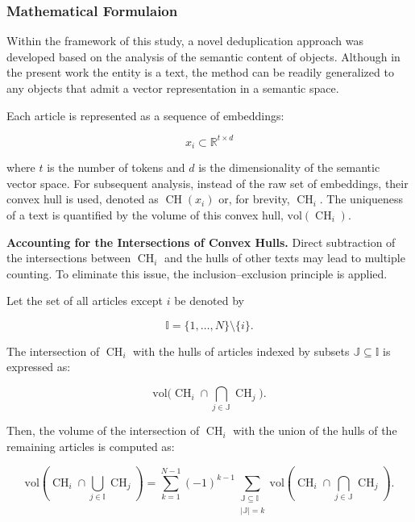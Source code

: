 \subsubsection{Mathematical Formulaion}
\label{sec:semantic_deduplication}
\sloppy  %

Within the framework of this study, a novel deduplication approach was developed based on the analysis of the semantic content of objects.
Although in the present work the entity is a text, the method can be readily generalized to any objects that admit a vector representation
in a semantic space.

Each article is represented as a sequence of embeddings:

\begin{equation}
    x_i \subset \mathbb{R}^{t\times d}
\end{equation}

where $t$ is the number of tokens and $d$ is the dimensionality of the semantic vector space. For subsequent analysis, instead of the raw set of embeddings,
their convex hull is used, denoted as $\operatorname{CH}(x_i)$ or, for brevity, $\operatorname{CH}_i$. The uniqueness of a text is quantified by the volume
of this convex hull, $\mathrm{vol}(\operatorname{CH}_i)$.

\textbf{Accounting for the Intersections of Convex Hulls.} Direct subtraction of the intersections between $\operatorname{CH}_i$ and the hulls of other
texts may lead to multiple counting. To eliminate this issue, the inclusion--exclusion principle is applied.

Let the set of all articles except $i$ be denoted by

\begin{equation}
    \mathbb{I} = \{1, \ldots, N\} \setminus \{i\}.
\end{equation}

The intersection of $\operatorname{CH}_i$ with the hulls of articles indexed by subsets $\mathbb{J} \subseteq \mathbb{I}$ is expressed as:

\begin{equation}
    \mathrm{vol}\Big(\operatorname{CH}_i \cap \bigcap_{j \in \mathbb{J}}\operatorname{CH}_j\Big).
\end{equation}

Then, the volume of the intersection of $\operatorname{CH}_i$ with the union of the hulls of the remaining articles is computed as:

\begin{equation}\label{eq:inclusion-exclusion_substituting}
    \mathrm{vol}\left(\operatorname{CH}_i \cap \bigcup_{j \in \mathbb{I}}\operatorname{CH}_j\right)
    =
    \sum_{k=1}^{N-1} (-1)^{k-1} \sum_{\substack{\mathbb{J} \subseteq \mathbb{I} \\ |\mathbb{J}| = k}}
    \mathrm{vol}\left(\operatorname{CH}_i \cap \bigcap_{j \in \mathbb{J}}\operatorname{CH}_j\right).
\end{equation}

